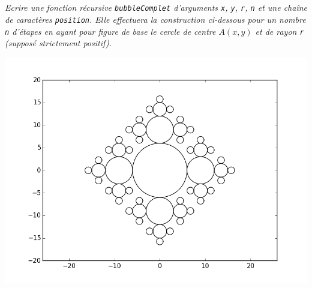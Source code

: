 \subparagraph{}
\textit{Ecrire une fonction récursive \texttt{bubbleComplet} d'arguments \texttt{x}, \texttt{y}, \texttt{r}, \texttt{n} 
et une chaîne de caractères \texttt{position}. Elle effectuera la construction ci-dessous pour un nombre \texttt{n} 
d'étapes en ayant pour figure de base le cercle de centre $A(x, y)$ et de rayon \texttt{r} (supposé strictement 
positif).}
\begin{center}
\includegraphics[width=.65\linewidth]{images/bulles}
\end{center}

